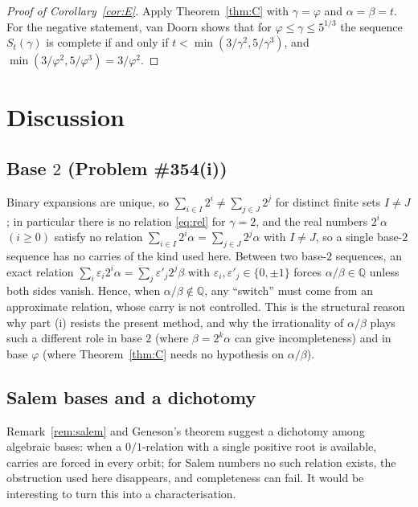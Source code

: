 \documentclass[11pt]{amsart}
\theoremstyle{definition}
\theoremstyle{remark}
\newcommand{\Q}{\mathbb{Q}}
\begin{document}
\begin{proof}[Proof of Corollary~\ref{cor:E}]
Apply Theorem~\ref{thm:C} with $\gamma=\varphi$ and $\alpha=\beta=t$. For the negative statement,
van Doorn \cite{vD26} shows that for $\varphi\le\gamma\le5^{1/3}$ the sequence $S_t(\gamma)$ is
complete if and only if $t<\min(3/\gamma^2,5/\gamma^3)$, and
$\min(3/\varphi^2,5/\varphi^3)=3/\varphi^2$.
\end{proof}

\section{Discussion}\label{sec:disc}

\subsection{Base \texorpdfstring{$2$}{2} (Problem \#354(i))}
Binary expansions are unique, so $\sum_{i\in I}2^i\ne\sum_{j\in J}2^j$ for distinct finite
sets $I\ne J$; in particular there is no relation \eqref{eq:rel} for $\gamma=2$, and the real
numbers $2^i\alpha$ $(i\ge0)$ satisfy no relation $\sum_{i\in I}2^i\alpha=\sum_{j\in J}2^j\alpha$
with $I\ne J$, so a single base-$2$ sequence has no carries of the kind used here. Between two
base-$2$ sequences, an exact relation
$\sum_{i}\varepsilon_i2^i\alpha=\sum_{j}\varepsilon'_j2^j\beta$ with
$\varepsilon_i,\varepsilon'_j\in\{0,\pm1\}$ forces $\alpha/\beta\in\Q$ unless both sides vanish.
Hence, when $\alpha/\beta\notin\Q$, any ``switch'' must come from an approximate relation, whose
carry is not controlled. This is the structural reason why part (i) resists the present
method, and why the irrationality of $\alpha/\beta$ plays such a different role in base $2$
(where $\beta=2^k\alpha$ can give incompleteness) and in base $\varphi$ (where
Theorem~\ref{thm:C} needs no hypothesis on $\alpha/\beta$).

\subsection{Salem bases and a dichotomy}
Remark~\ref{rem:salem} and Geneson's theorem \cite{Gen26} suggest a dichotomy among algebraic
bases: when a $0/1$-relation with a single positive root is available, carries are forced in
every orbit; for Salem numbers no such relation exists, the obstruction used here disappears, and
completeness can fail. It would be interesting to turn this into a characterisation.
\end{document}
